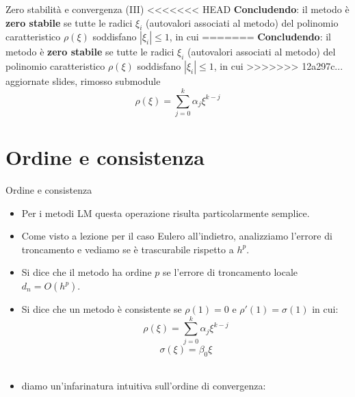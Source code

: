 \documentclass[aspectratio=169, 10pt, handout,usenames,dvipsnames]{beamer}
\begin{document}
    \begin{frame}{Zero stabilità e convergenza (III)}
<<<<<<< HEAD
        \textbf{Concludendo}: il metodo è \textbf{zero stabile} se tutte le radici $\xi_i$ (autovalori associati al metodo) del polinomio caratteristico $\rho(\xi)$ soddisfano $|\xi_i|\leq1$, in cui
=======
        \textbf{Concludendo}: il metodo è \textbf{zero stabile} se tutte le radici $\xi_i$ (autovalori associati al metodo) del polinomio caratteristico $\rho(\xi)$ soddisfano $|\xi_i|\leq1$, in cui
>>>>>>> 12a297c... aggiornate slides, rimosso submodule
        $$
            \rho(\xi)=\displaystyle\sum_{j=0}^k \alpha_j\xi^{k-j}
        $$
    \end{frame}

\section{Ordine e consistenza}\label{sec:sec8}
    \begin{frame}{Ordine e consistenza }
        \begin{itemize}
            \item Per i metodi LM questa operazione risulta particolarmente semplice.
        \end{itemize}
        \begin{itemize}
            \item Come visto a lezione per il caso Eulero all'indietro, analizziamo l'errore di troncamento e vediamo se è trascurabile rispetto a $h^p$.
            \item Si dice che il metodo ha ordine $p$ se l'errore di troncamento locale $d_n = O(h^p)$.
            \item Si dice che un metodo è consistente se $\rho(1) = 0$ \space e \space $\rho'(1) = \sigma(1)$ in cui:\\
            \[\rho(\xi) = \displaystyle\sum_{j=0}^k \alpha_j\xi^{k-j}\]  \space\space\space \[\sigma(\xi) = \beta_0\xi \] \\

            \item diamo un'infarinatura intuitiva sull'ordine di convergenza:
        \end{itemize}

    \end{frame}
\end{document}
